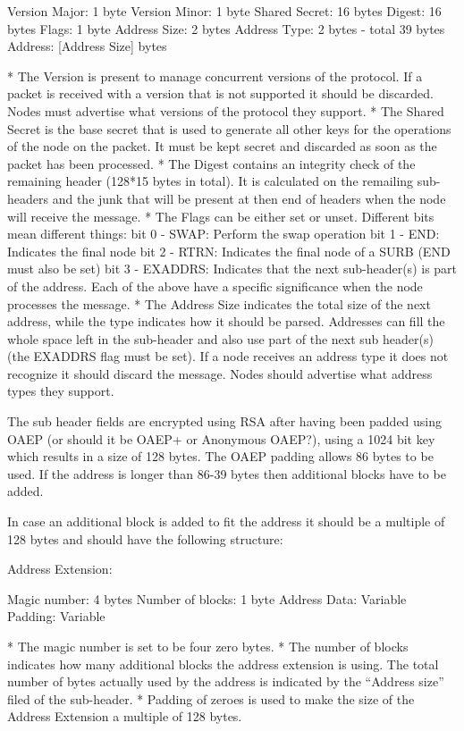 Version Major: 1 byte
Version Minor: 1 byte
Shared Secret: 16 bytes
Digest:        16 bytes
Flags:         1 byte
Address Size:  2 bytes
Address Type:  2 bytes - total 39 bytes
Address:       [Address Size] bytes

* The Version is present to manage concurrent versions of the
protocol. If a packet is received with a version that is not supported
it should be discarded. Nodes must advertise what versions of the
protocol they support.
* The Shared Secret is the base secret that is used to generate all
other keys for the operations of the node on the packet. It must be
kept secret and discarded as soon as the packet has been processed. 
* The Digest contains an integrity check of the remaining header (128*15
bytes in total). It is calculated on the remailing sub-headers and the
junk that will be present at then end of headers when the node will
receive the message. 
* The Flags can be either set or unset. Different bits mean different
things: 
bit 0 - SWAP: Perform the swap operation
bit 1 - END:  Indicates the final node
bit 2 - RTRN: Indicates the final node of a SURB (END must also be set)
bit 3 - EXADDRS: Indicates that the next sub-header(s) is part of the
address. 
Each of the above have a specific significance when the node processes
the message. 
* The Address Size indicates the total size of the next address, while
the type indicates how it should be parsed. Addresses can fill the
whole space left in the sub-header and also use part of the next sub
header(s) (the EXADDRS flag must be set). If a node receives an address
type it does not recognize it should discard the message. Nodes should
advertise what address types they support.

The sub header fields are encrypted using RSA after having been padded
using OAEP (or should it be OAEP+ or Anonymous OAEP?), using a 1024
bit key which results in a size of 128 bytes. The OAEP padding allows
86 bytes to be used. If the address is longer than 86-39 bytes then
additional blocks have to be added.

In case an additional block is added to fit the address it should be a
multiple of 128 bytes and should have the following structure:
 
Address Extension:

Magic number:     4 bytes
Number of blocks: 1 byte
Address Data:     Variable
Padding:          Variable

* The magic number is set to be four zero bytes.
* The number of blocks indicates how many additional blocks the address
extension is using. The total number of bytes actually used by the
address is indicated by the ``Address size'' filed of the sub-header.  
* Padding of zeroes is used to make the size of the Address Extension a
multiple of 128 bytes.  

